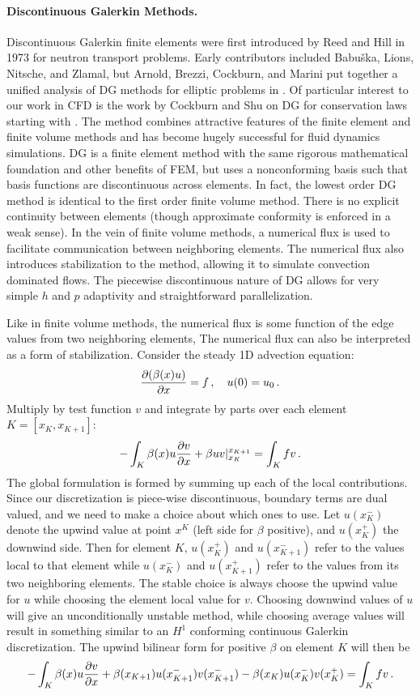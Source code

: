 \documentclass[Dissertation.tex]{subfiles}
\begin{document}
\paragraph{Discontinuous Galerkin Methods.}
Discontinuous Galerkin finite elements were first introduced by Reed and Hill in 1973 for neutron transport problems\cite{ReedHillDG}.
Early contributors included Babu\v{s}ka, Lions, Nitsche, and Zlamal, but Arnold, Brezzi, Cockburn, and Marini put together a unified analysis
of DG methods for elliptic problems in \cite{ArnoldDG}.
Of particular interest to our work in CFD is the work by Cockburn and Shu on DG for conservation laws starting with \cite{CockburnShuDG}.
The method combines attractive features of the finite element and finite volume methods and has become hugely successful for fluid dynamics simulations.
DG is a finite element method with the same rigorous mathematical foundation and other benefits of FEM, but uses a nonconforming basis such that basis
functions are discontinuous across elements.
In fact, the lowest order DG method is identical to the first order finite volume method.
There is no explicit continuity between elements (though approximate conformity is enforced in a weak sense).
In the vein of finite volume methods, a numerical flux is used to facilitate communication between neighboring elements.
The numerical flux also introduces stabilization to the method, allowing it to simulate convection dominated flows.
The piecewise discontinuous nature of DG allows for very simple $h$ and $p$ adaptivity and straightforward parallelization.

Like in finite volume methods, the numerical flux is some function of the edge values from two neighboring elements,
The numerical flux can also be interpreted as a form of stabilization\cite{DGStabilization}.
Consider the steady 1D advection equation:
\[
\frac{\partial(\beta(x)u)}{\partial x}=f\,,\quad u(0)=u_0\,.
\]
Multiply by test function $v$ and integrate by parts over each element $K=[x_K,x_{K+1}]$:
\[
-\int_K\beta(x)u\frac{\partial v}{\partial x}+\beta uv|_{x_K}^{x_{K+1}}=\int_K fv\,.
\]
The global formulation is formed by summing up each of the local contributions.
Since our discretization is piece-wise discontinuous, boundary terms are dual valued, and we need
to make a choice about which ones to use.
Let $u(x_K^-)$ denote the upwind value at point $x^K$ (left side for $\beta$ positive), and $u(x_K^+)$ the downwind side.
Then for element $K$, $u(x_K^+)$ and $u(x_{K+1}^-)$ refer to the values local to that element while $u(x_K^-)$ and $u(x_{K+1}^+)$ refer to the
values from its two neighboring elements.
The stable choice is always choose the upwind value for $u$ while choosing the element local value for $v$.
Choosing downwind values of $u$ will give an unconditionally unstable method, while choosing average values will result in something similar
to an $H^1$ conforming continuous Galerkin discretization\cite{DGStabilization}.
The upwind bilinear form for positive $\beta$ on element $K$ will then be
\[
-\int_K\beta(x)u\frac{\partial v}{\partial x}+\beta(x_{K+1})u(x_{K+1}^-)v(x_{K+1}^-)-\beta(x_K)u(x_K^-)v(x_K^+)=\int_K fv\,.
\]
\end{document}
